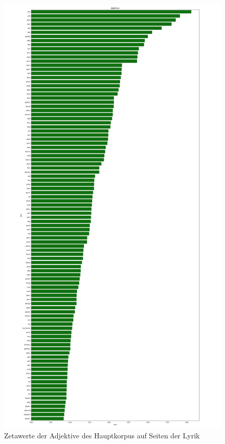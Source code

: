 \documentclass[a4paper,10p]{article}
\begin{document}
\begin{figure}{}
    \centering
    \begin{minipage}[b]{.45\linewidth}
        \centering
        \includegraphics[width=.6\linewidth]{haupt_adjektive_pro_wort.png}
        \caption{Zetawerte der Adjektive des Hauptkorpus auf Seiten der Lyrik}
        \label{haupt_adjektive}
    \end{minipage}
    \hfill
    \begin{minipage}[b]{.45\linewidth}
        \centering

\end{minipage}
\end{figure}
\end{document}
